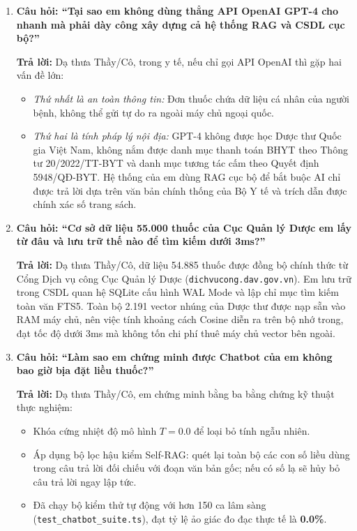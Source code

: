 \documentclass[12pt,a4paper]{article}
\begin{document}
\begin{enumerate}[leftmargin=1.5em]
    \item \textbf{Câu hỏi: ``Tại sao em không dùng thẳng API OpenAI GPT-4 cho nhanh mà phải dày công xây dựng cả hệ thống RAG và CSDL cục bộ?''}
    
    \textbf{Trả lời:} Dạ thưa Thầy/Cô, trong y tế, nếu chỉ gọi API OpenAI thì gặp hai vấn đề lớn:
    \begin{itemize}[leftmargin=1.2em]
        \item \textit{Thứ nhất là an toàn thông tin:} Đơn thuốc chứa dữ liệu cá nhân của người bệnh, không thể gửi tự do ra ngoài máy chủ ngoại quốc.
        \item \textit{Thứ hai là tính pháp lý nội địa:} GPT-4 không được học Dược thư Quốc gia Việt Nam, không nắm được danh mục thanh toán BHYT theo Thông tư 20/2022/TT-BYT và danh mục tương tác cấm theo Quyết định 5948/QĐ-BYT. Hệ thống của em dùng RAG cục bộ để bắt buộc AI chỉ được trả lời dựa trên văn bản chính thống của Bộ Y tế và trích dẫn được chính xác số trang sách.
    \end{itemize}

    \item \textbf{Câu hỏi: ``Cơ sở dữ liệu 55.000 thuốc của Cục Quản lý Dược em lấy từ đâu và lưu trữ thế nào để tìm kiếm dưới 3ms?''}
    
    \textbf{Trả lời:} Dạ thưa Thầy/Cô, dữ liệu 54.885 thuốc được đồng bộ chính thức từ Cổng Dịch vụ công Cục Quản lý Dược (\texttt{dichvucong.dav.gov.vn}). Em lưu trữ trong CSDL quan hệ SQLite cấu hình WAL Mode và lập chỉ mục tìm kiếm toàn văn FTS5. Toàn bộ 2.191 vector nhúng của Dược thư được nạp sẵn vào RAM máy chủ, nên việc tính khoảng cách Cosine diễn ra trên bộ nhớ trong, đạt tốc độ dưới 3ms mà không tốn chi phí thuê máy chủ vector bên ngoài.

    \item \textbf{Câu hỏi: ``Làm sao em chứng minh được Chatbot của em không bao giờ bịa đặt liều thuốc?''}
    
    \textbf{Trả lời:} Dạ thưa Thầy/Cô, em chứng minh bằng ba bằng chứng kỹ thuật thực nghiệm:
    \begin{itemize}[leftmargin=1.2em]
        \item Khóa cứng nhiệt độ mô hình $T = 0.0$ để loại bỏ tính ngẫu nhiên.
        \item Áp dụng bộ lọc hậu kiểm Self-RAG: quét lại toàn bộ các con số liều dùng trong câu trả lời đối chiếu với đoạn văn bản gốc; nếu có số lạ sẽ hủy bỏ câu trả lời ngay lập tức.
        \item Đã chạy bộ kiểm thử tự động với hơn 150 ca lâm sàng (\texttt{test\_chatbot\_suite.ts}), đạt tỷ lệ ảo giác đo đạc thực tế là \textbf{0.0\%}.
    \end{itemize}


\end{enumerate}
\end{document}
